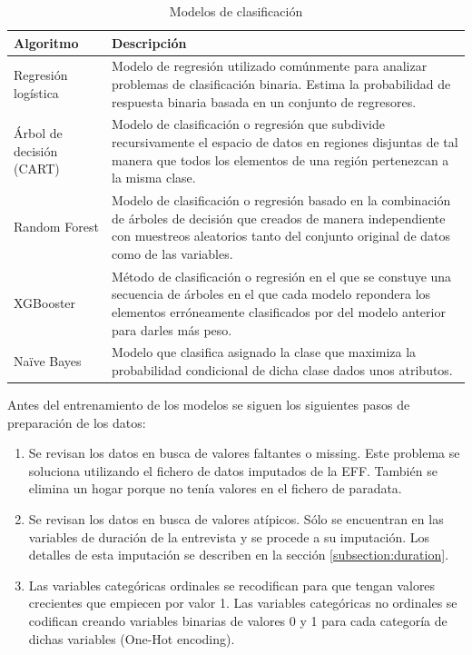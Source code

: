 \begin{table}[htbp]
\centering{}
\begin{tabular}{l p{10cm}}
\hline
\textbf{Algoritmo} & \textbf{Descripción} \\ \hline
Regresión logística & Modelo de regresión utilizado comúnmente para analizar problemas de clasificación binaria. Estima la probabilidad de respuesta binaria basada en un conjunto de regresores. \\ \hline
Árbol de decisión (CART) & Modelo de clasificación o regresión que subdivide recursivamente el espacio de datos en regiones disjuntas de tal manera que todos los elementos de una región pertenezcan a la misma clase. \\ \hline
Random Forest & Modelo de clasificación o regresión basado en la combinación  de árboles de decisión que creados de manera independiente con muestreos aleatorios tanto del conjunto original de datos como de las variables. \\ \hline
XGBooster & Método de clasificación o regresión en el que se constuye una secuencia de árboles en el que cada modelo repondera los elementos erróneamente clasificados por del modelo anterior para darles más peso. \\ \hline
Naïve Bayes & Modelo que clasifica asignado la clase que maximiza la probabilidad condicional de dicha clase dados unos atributos. \\ \hline
\end{tabular}
\caption{Modelos de clasificación}
\label{table:classifiers}
\end{table}

Antes del entrenamiento de los modelos se siguen los siguientes pasos de preparación de los datos:
\begin{enumerate}
    \item Se revisan los datos en busca de valores faltantes o missing. Este problema se soluciona utilizando el fichero de datos imputados de la EFF. También se elimina un hogar porque no tenía valores en el fichero de paradata.
    \item Se revisan los datos en busca de valores atípicos. Sólo se encuentran en las variables de duración de la entrevista y se procede a su imputación. Los detalles de esta imputación se describen en la sección \ref{subsection:duration}.
    \item Las variables categóricas ordinales se recodifican para que tengan valores crecientes que empiecen por valor 1. Las variables categóricas no ordinales se codifican creando variables binarias de valores 0 y 1 para cada categoría de dichas variables (One-Hot encoding).
\end{enumerate}


